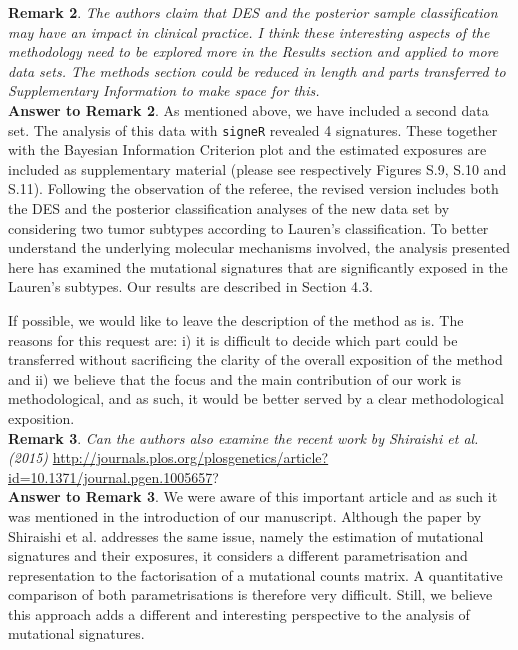 \documentclass[11pt]{amsart}
\begin{document}
\textbf{Remark 2}. \emph{The authors claim that DES and the posterior sample classification may have an impact in clinical practice. I think these interesting aspects of the methodology need to be explored more in the Results section and applied to more data sets. The methods section could be reduced in length and parts transferred to Supplementary Information to make space for this.}
\\

\textbf{Answer to Remark 2}. As mentioned above, we have included a second data set. The analysis of this data with \texttt{signeR} revealed 4 signatures. These together with the Bayesian Information Criterion plot and the estimated exposures are included as supplementary material (please see respectively Figures S.9, S.10 and S.11).  Following the observation of the referee, the revised version includes both the DES and the posterior classification analyses of the new data set by considering two tumor subtypes according to Lauren's classification.
To better understand the underlying molecular mechanisms involved, the analysis presented here has examined the mutational signatures that are significantly exposed in the Lauren's subtypes. Our results are described in Section 4.3.

If possible, we would like to leave the description of the method as is. The reasons for this request are: i) it is difficult to decide which part could be transferred without sacrificing the clarity of the overall exposition of the method and ii) we believe that the focus and the main contribution of our work is methodological, and as such, it would be better served by a clear methodological exposition.
\\

\textbf{Remark 3}. \emph{Can the authors also examine the recent work by Shiraishi et al. (2015)}
\url{http://journals.plos.org/plosgenetics/article?id=10.1371/journal.pgen.1005657}?
\\

\textbf{Answer to Remark 3}. We were aware of this important article and as such it was mentioned in the introduction of our manuscript. Although the paper by Shiraishi et al. addresses the same issue, namely the estimation of mutational signatures and their exposures, it considers a different parametrisation and representation to the factorisation of a mutational counts matrix. A quantitative comparison of both parametrisations is therefore very difficult. Still, we believe this approach adds a different and interesting perspective to the analysis of mutational signatures.
\end{document}
